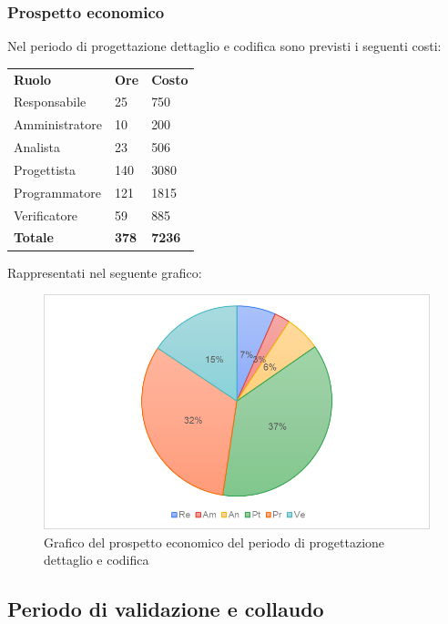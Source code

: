 \subsubsection{Prospetto economico}
Nel periodo di progettazione dettaglio e codifica sono previsti i seguenti costi:
\begin{longtable} {
		>{}p{32mm}
		>{}p{20mm}
		>{}p{20mm}
	}
	\rowcolor{gray!50}
	
	\textbf{Ruolo} & \textbf{Ore} & \textbf{Costo} \TBstrut \\
	Responsabile & 25 & 750 \TBstrut \\
	Amministratore & 10 & 200 \TBstrut \\
	Analista & 23 & 506 \TBstrut \\
	Progettista & 140 & 3080 \TBstrut \\
	Programmatore & 121 & 1815 \TBstrut \\
	Verificatore & 59 & 885 \TBstrut \\
	\textbf{Totale} & \textbf{378}& \textbf{7236} \TBstrut \\		
\end{longtable}
Rappresentati nel seguente grafico: \\
\begin{figure} [h!]
	\includegraphics[width=\linewidth]{./img/Grafici/6.png}
	\caption{Grafico del prospetto economico del periodo di progettazione dettaglio e codifica}
\end{figure}

\subsection{Periodo di validazione e collaudo}

